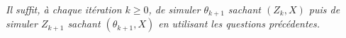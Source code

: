 \documentclass[a4paper,10pt,fleqn]{article}
\newcommand{\eqsp}{\,}
\newcommand{\1}{\ensuremath{\mathbbm{1}}}
\begin{document}
\begin{enumerate}
\vspace{.2cm}

{\em
Il suffit, \`a chaque it\'eration $k\geq 0$, de simuler $\theta_{k+1}$ sachant $(Z_k,X)$ puis de simuler $Z_{k+1}$ sachant $(\theta_{k+1},X)$ en utilisant les questions pr\'ec\'edentes.
}
\end{enumerate}

\end{document}
